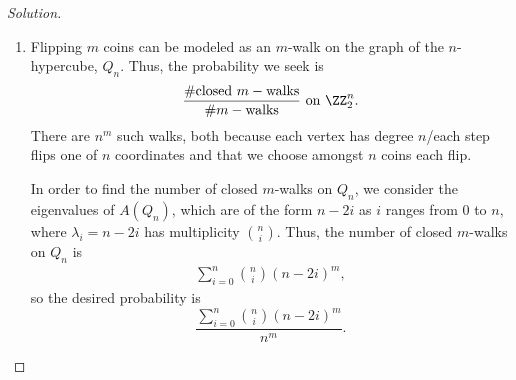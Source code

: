 \documentclass[11pt]{scrartcl}
\begin{document}
\begin{proof}[Solution]
    \phantom{0}
\begin{enumerate}[(i.)]
    \item Flipping $m$ coins can be modeled as an $m$-walk on the graph of the $n$-hypercube, $Q_n$. Thus, the probability we seek is \[\frac{\#\text{closed }m-\text{walks}}{\#m-\text{walks}}\text{ on }\ZZ_2^n.\] There are $n^m$ such walks, both because each vertex has degree $n$/each step flips one of $n$ coordinates and that we choose amongst $n$ coins each flip. 
    
    In order to find the number of closed $m$-walks on $Q_n$, we consider the eigenvalues of $A(Q_n)$, which are of the form $n-2i$ as $i$ ranges from $0$ to $n$, where $\lambda_i=n-2i$ has multiplicity $\binom{n}{i}$. Thus, the number of closed $m$-walks on $Q_n$ is
    \begin{align*}
        \sum_{i = 0}^{n} \binom{n}{i} (n-2i)^m,
    \end{align*}
    so the desired probability is \[\dfrac{\sum_{i = 0}^{n} \binom{n}{i} (n-2i)^m}{n^m}.\]


\end{enumerate}
\end{proof}
\end{document}
